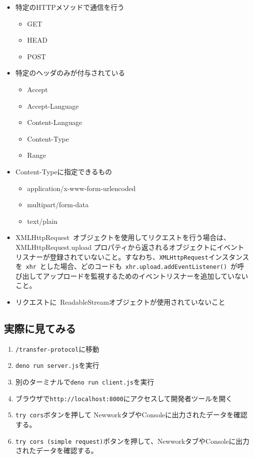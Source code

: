 \begin{itemize}
\tightlist
\item
  特定のHTTPメソッドで通信を行う

  \begin{itemize}
  \tightlist
  \item
    GET
  \item
    HEAD
  \item
    POST
  \end{itemize}
\item
  特定のヘッダのみが付与されている

  \begin{itemize}
  \tightlist
  \item
    Accept
  \item
    Accept-Language
  \item
    Content-Language
  \item
    Content-Type
  \item
    Range
  \end{itemize}
\item
  Content-Typeに指定できるもの

  \begin{itemize}
  \tightlist
  \item
    application/x-www-form-urlencoded
  \item
    multipart/form-data
  \item
    text/plain
  \end{itemize}
\item
  XMLHttpRequest~オブジェクトを使用してリクエストを行う場合は、XMLHttpRequest.upload
  プロパティから返されるオブジェクトにイベントリスナーが登録されていないこと。すなわち、\texttt{XMLHttpRequest}インスタンスを~\texttt{xhr}~とした場合、どのコードも~\texttt{xhr.upload.addEventListener()}~が呼び出してアップロードを監視するためのイベントリスナーを追加していないこと。
\item
  リクエストに~ReadableStreamオブジェクトが使用されていないこと
\end{itemize}

\subsection{実際に見てみる}\label{ux5b9fux969bux306bux898bux3066ux307fux308b-1}

\begin{enumerate}
\def\labelenumi{\arabic{enumi}.}
\tightlist
\item
  \texttt{/transfer-protocol}に移動
\item
  \texttt{deno\ run\ server.js}を実行
\item
  別のターミナルで\texttt{deno\ run\ client.js}を実行
\item
  ブラウザで\texttt{http://localhost:8000}にアクセスして開発者ツールを開く
\item
  \texttt{try\ cors}ボタンを押して
  NewworkタブやConsoleに出力されたデータを確認する。
\item
  \texttt{try\ cors\ (simple\ request)}ボタンを押して、NewworkタブやConsoleに出力されたデータを確認する。
\end{enumerate}

